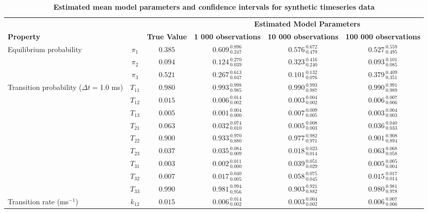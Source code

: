 
\begin{table*}
\caption{{\bf Estimated mean model parameters and confidence intervals for synthetic timeseries data}}
\label{table:synthetic-confidence-intervals}
\begin{tabular*}{\textwidth}{@{\extracolsep{\fill}}lccccc}
\hline
&  &  & \multicolumn{3}{c}{\bf Estimated Model Parameters}  \\ \cline{4-6}
\multicolumn{2}{l}{\bf Property} & \bf True Value & \bf 1 000 observations & \bf 10 000 observations & \bf 100 000 observations\\ \hline
		Equilibrium probability 		& $\pi_{1}$ & $0.385$ & $0.609_{\:0.247}^{\:0.896}$  & $0.576_{\:0.479}^{\:0.672}$  & $0.527_{\:0.495}^{\:0.559}$  \\
		& $\pi_{2}$ & $0.094$ & $0.124_{\:0.039}^{\:0.270}$  & $0.323_{\:0.240}^{\:0.416}$  & $0.093_{\:0.085}^{\:0.101}$  \\
		& $\pi_{3}$ & $0.521$ & $0.267_{\:0.047}^{\:0.613}$  & $0.101_{\:0.076}^{\:0.132}$  & $0.379_{\:0.351}^{\:0.409}$  \\
		\hline
		Transition probability ($\Delta t = $1.0 ms) 		& $T_{11}$ & $0.980$ & $0.993_{\:0.985}^{\:0.998}$ & $0.990_{\:0.987}^{\:0.993}$ & $0.990_{\:0.989}^{\:0.991}$ \\
		& $T_{12}$ & $0.015$ & $0.006_{\:0.002}^{\:0.014}$ & $0.003_{\:0.002}^{\:0.004}$ & $0.006_{\:0.006}^{\:0.007}$ \\
		& $T_{13}$ & $0.005$ & $0.001_{\:0.000}^{\:0.004}$ & $0.007_{\:0.005}^{\:0.009}$ & $0.003_{\:0.003}^{\:0.004}$ \\
		& $T_{21}$ & $0.063$ & $0.032_{\:0.010}^{\:0.074}$ & $0.005_{\:0.003}^{\:0.008}$ & $0.036_{\:0.033}^{\:0.040}$ \\
		& $T_{22}$ & $0.900$ & $0.933_{\:0.880}^{\:0.970}$ & $0.977_{\:0.971}^{\:0.982}$ & $0.901_{\:0.894}^{\:0.908}$ \\
		& $T_{23}$ & $0.037$ & $0.035_{\:0.009}^{\:0.084}$ & $0.018_{\:0.014}^{\:0.023}$ & $0.063_{\:0.058}^{\:0.068}$ \\
		& $T_{31}$ & $0.003$ & $0.002_{\:0.000}^{\:0.011}$ & $0.039_{\:0.029}^{\:0.051}$ & $0.005_{\:0.004}^{\:0.005}$ \\
		& $T_{32}$ & $0.007$ & $0.017_{\:0.005}^{\:0.040}$ & $0.058_{\:0.045}^{\:0.075}$ & $0.015_{\:0.014}^{\:0.017}$ \\
		& $T_{33}$ & $0.990$ & $0.981_{\:0.956}^{\:0.994}$ & $0.903_{\:0.882}^{\:0.921}$ & $0.980_{\:0.978}^{\:0.981}$ \\
		\hline
		\hline
		Transition rate (ms$^{-1}$) 		& $k_{12}$ & $0.015$ & $0.006_{\:0.002}^{\:0.014}$ & $0.003_{\:0.002}^{\:0.004}$ & $0.006_{\:0.006}^{\:0.007}$ \\

\end{tabular*}
\end{table*}
